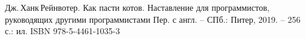 \begingroup 
\begin{thebibliography}{00}

	Дж.\,Ханк\,Рейнвотер.
	Как пасти котов. Наставление для программистов, руководящих другими программистами
	Пер. с англ. -- СПб.: Питер, 2019. --
    256 с.: ил.
    ISBN 978-5-4461-1035-3

\end{thebibliography}
\endgroup

\clearpage